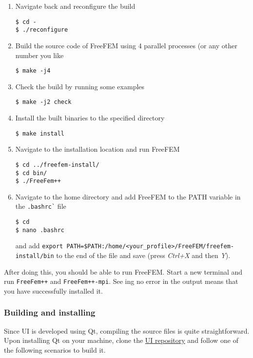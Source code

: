 \begin{enumerate}
\item Navigate back and reconfigure the build
\begin{verbatim}
$ cd -
$ ./reconfigure
\end{verbatim}

\item Build the source code of FreeFEM using 4 parallel processes (or any other number you like
\begin{verbatim}
$ make -j4
\end{verbatim}

\item Check the build by running some examples
\begin{verbatim}
$ make -j2 check
\end{verbatim}

\item Install the built binaries to the specified directory
\begin{verbatim}
$ make install
\end{verbatim}

\item Navigate to the installation location and run FreeFEM
\begin{verbatim}
$ cd ../freefem-install/
$ cd bin/
$ ./FreeFem++
\end{verbatim}

\item Navigate to the home directory and add FreeFEM to the PATH variable in the \verb|.bashrc`| file
\begin{verbatim}
$ cd
$ nano .bashrc
\end{verbatim}
and add \verb|export PATH=$PATH:/home/<your_profile>/FreeFEM/freefem-install/bin| to the end of the file and save (press \textit{Ctrl+X} and then \textit{Y}).

\end{enumerate}

After doing this, you should be able to run FreeFEM. Start a new terminal and run \verb|FreeFem++| and \verb|FreeFem++-mpi|. See ing no error in the output means that you have successfully installed it.

\subsubsection{Building and installing \biodeg{}} \label{sec:build_biodeg}

Since \biodeg{} UI is developed using Qt, compiling the source files is quite straightforward. Upon installing Qt on your machine, clone the \href{https://github.com/mbarzegary/BioDeg-UI}{\biodeg{} UI repository} and follow one of the following scenarios to build it. 

